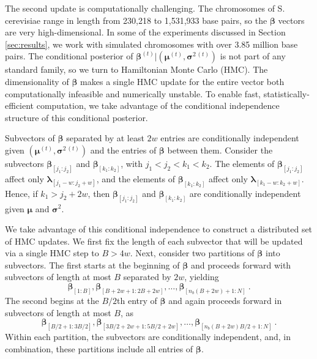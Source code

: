 The second update is computationally challenging.
The chromosomes of S. cerevisiae range in length from 230,218 to 1,531,933 base pairs, so the $\bm \beta$ vectors are very high-dimensional.
In some of the experiments discussed in Section \ref{sec:results}, we work with simulated chromosomes with over 3.85 million base pairs.
The conditional posterior of $\bm \beta^{(t)} | (\bm \mu^{(t)}, \bm \sigma^{2\,(t)})$ is not part of any standard family, so we turn to Hamiltonian Monte Carlo (HMC).
The dimensionality of $\bm \beta$ makes a single HMC update for the entire vector both computationally infeasible and numerically unstable.
To enable fast, statistically-efficient computation, we take advantage of the conditional independence structure of this conditional posterior.

Subvectors of $\bm \beta$ separated by at least $2w$ entries are conditionally independent given $(\bm \mu^{(t)}, \bm \sigma^{2\,(t)})$ and the entries of $\bm \beta$ between them.
Consider the subvectors $\bm \beta_{[j_1 : j_2]}$ and $\bm \beta_{[k_1 : k_2]}$, with $j_1 < j_2 < k_1 < k_2$.
The elements of $\bm \beta_{[j_1 : j_2]}$ affect only $\bm \lambda_{[j_1 - w : j_2 + w]}$, and the elements of $\bm \beta_{[k_1 : k_2]}$ affect only $\bm \lambda_{[k_1 - w : k_2 + w]}$.
Hence, if $k_1 > j_2 + 2w$, then $\bm \beta_{[j_1 : j_2]}$ and $\bm \beta_{[k_1 : k_2]}$ are conditionally independent given $\bm \mu$ and $\bm \sigma^2$.

We take advantage of this conditional independence to construct a distributed set of HMC updates.
We first fix the length of each subvector that will be updated via a single HMC step to $B > 4w$.
Next, consider two partitions of $\bm \beta$ into subvectors.
The first starts at the beginning of $\bm \beta$ and proceeds forward with subvectors of length at most $B$ separated by $2w$, yielding
$$\bm \beta_{[1 : B]}, \bm \beta_{[B + 2w + 1 : 2B + 2w]}, \ldots, \bm \beta_{[n_b (B + 2w) + 1 : N]} \ .$$
The second begins at the $B/2$th entry of $\bm \beta$ and again proceeds forward in subvectors of length at most $B$, as
$$\bm \beta_{[B/2 + 1 : 3B/2]}, \bm \beta_{[3B/2 + 2w + 1 : 5B/2 + 2w]}, \ldots, \bm \beta_{[n_b (B + 2w) B/2 + 1 : N]} \ .$$
Within each partition, the subvectors are conditionally independent, and, in combination, these partitions include all entries of $\bm \beta$.

